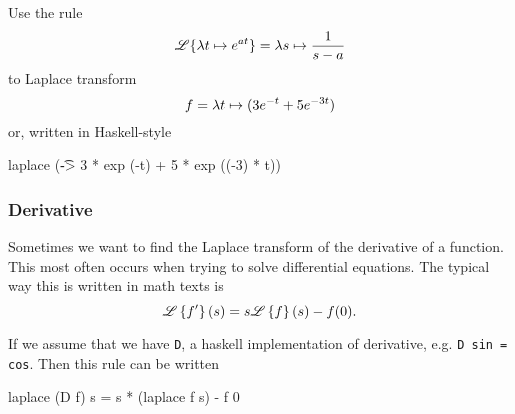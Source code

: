 \begin{example}
    Use the rule 
\begin{equation*}
    \mathscr{L} \{\lambda t \mapsto e^{at}\} = \lambda s \mapsto \frac{1}{s-a}
\end{equation*}
    to Laplace transform 
\begin{equation*}
    f = \lambda t \mapsto (3e^{-t} + 5 e^{-3t})
\end{equation*}
or, written in Haskell-style
\begin{codeeq} 
    laplace (\t -> 3 * exp (-t) + 5 * exp ((-3) * t)) 
\end{codeeq} 
\end{example}
\begin{solution}

\end{solution} 

\subsubsection{Derivative} 
Sometimes we want to find the Laplace transform of the derivative of a function. This most often occurs when trying to solve differential equations. The typical way this is written in math texts is
\begin{equation*}
    \mathscr{L} \left\{f'\right\}(s) = s \mathscr{L} \left\{f\right\}(s) - f(0). 
\end{equation*}

If we assume that we have \verb|D|, a haskell implementation of derivative, e.g. \verb|D sin = cos|.
Then this rule can be written

\begin{codeeq}
    laplace (D f) s = s * (laplace f s) - f 0
\end{codeeq}

\iffalse 
\begin{align*} 
    \Lplc \{ f'(t) \}(s) &= s F(s) - f(0) \\ 
                         &= s F(s) - 1. 
\end{align*} 
Then we do the same thing to the right hand side. 

\begin{align*} 
    \Lplc \{- f(t)\} = - F(s).
\end{align*} 

Setting these two expressions equal gives us
\begin{align*} 
     s F(s) - 1 &= - F(s) \implies{} \\ 
     s F(s) + F(s) &= 1  \\
     (s+1) F(s) &= 1  \\
     F(s) &= \frac{1}{s+1}
\end{align*} 
\fi

